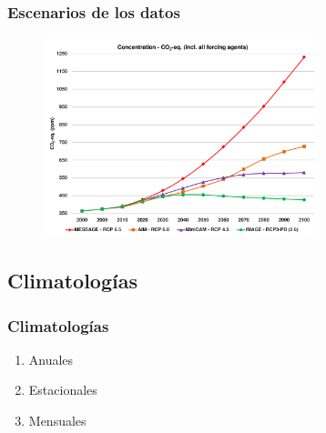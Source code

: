 \documentclass{beamer}
\newtheorem{Th2}{Definición}
\begin{document}
		\begin{frame}
			\frametitle{Escenarios de los datos}
			\begin{figure}[!h]
				\centering
				\includegraphics[width=8cm]{CO2-concentration.png}
			\end{figure}
		\end{frame}

	\subsection{Climatologías}
	\begin{frame}
		\frametitle{Climatologías}
		\begin{enumerate}%
			\item Anuales\pause%
			\item Estacionales\pause%
			\item Mensuales%
		\end{enumerate}
	\end{frame} 

\end{document}
